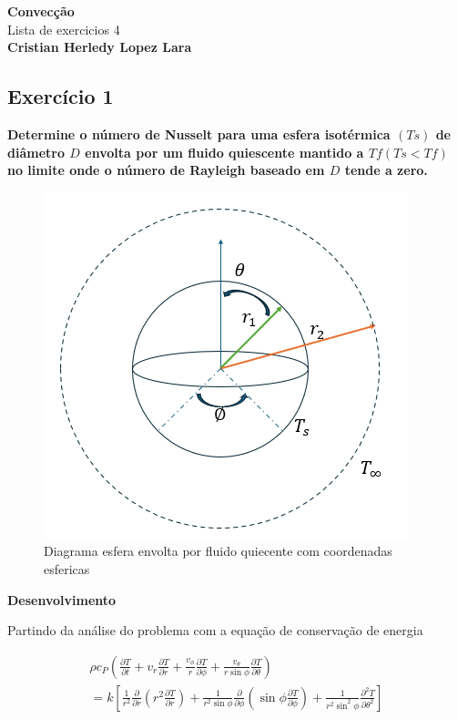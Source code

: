 \documentclass[12pt]{article}
\title{}
\author{}
\begin{document}
\begin{center}
	{\tiny {\normalsize {\large \textbf{Convecção}\\ Lista de exercicios 4\\
	
	\textbf{Cristian Herledy Lopez Lara}}}}
\end{center}

\subsection*{Exercício 1}


\textbf{Determine o número de Nusselt para uma esfera isotérmica $(Ts)$ de diâmetro $D$ envolta por um fluido quiescente mantido a $Tf (Ts < Tf)$ no limite onde o número de Rayleigh baseado em $D$ tende a zero.}\\

\begin{figure}[H]
	\centering
	\includegraphics[width=.65\textwidth]{Figures/1_1}
	\caption{Diagrama esfera envolta por fluido quiecente com coordenadas esfericas}
\end{figure}

\textbf{Desenvolvimento} 


Partindo da análise do problema com a equação de conservação de energia


\begin{equation}
	\begin{aligned}
		\rho c_P \left( \frac{\partial T}{\partial t} + v_r \frac{\partial T}{\partial r} + \frac{v_\phi}{r} \frac{\partial T}{\partial \phi} + \frac{v_\theta}{r \sin \phi} \frac{\partial T}{\partial \theta} \right) \\
		= k \left[ \frac{1}{r^2} \frac{\partial}{\partial r} \left( r^2 \frac{\partial T}{\partial r} \right) + \frac{1}{r^2 \sin \phi} \frac{\partial}{\partial \phi} \left( \sin \phi \frac{\partial T}{\partial \phi} \right) + \frac{1}{r^2 \sin^2 \phi} \frac{\partial^2 T}{\partial \theta^2} \right]
	\end{aligned}
\end{equation} \\
\end{document}
